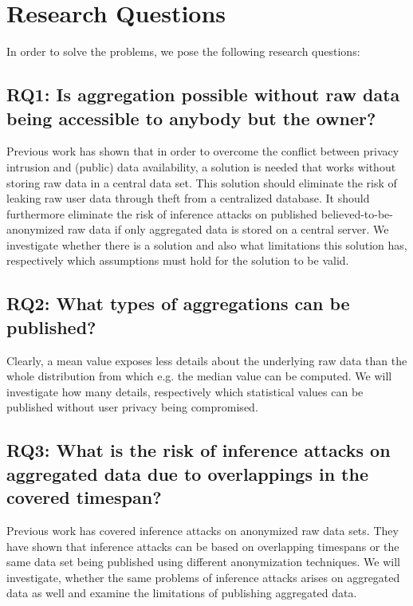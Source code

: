 \section{Research Questions}
In order to solve the problems, we pose the following research questions:

\subsection*{RQ1: Is aggregation possible without raw data being accessible to anybody but the owner?}
Previous work has shown that in order to overcome the conflict between privacy intrusion and (public) data availability, a solution is needed that works without storing raw data in a central data set.
This solution should eliminate the risk of leaking raw user data through theft from a centralized database. It should furthermore eliminate the risk of inference attacks on published believed-to-be-anonymized raw data if only aggregated data is stored on a central server. We investigate whether there is a solution and also what limitations this solution has, respectively which assumptions must hold for the solution to be valid.

\subsection*{RQ2: What types of aggregations can be published?}
Clearly, a mean value exposes less details about the underlying raw data than the whole distribution from which e.g. the median value can be computed. We will investigate how many details, respectively which statistical values can be published without user privacy being compromised.

\subsection*{RQ3: What is the risk of inference attacks on aggregated data due to overlappings in the covered timespan?}
Previous work has covered inference attacks on anonymized raw data sets. They have shown that inference attacks can be based on overlapping timespans or the same data set being published using different anonymization techniques. We will investigate, whether the same problems of inference attacks arises on aggregated data as well and examine the limitations of publishing aggregated data.

